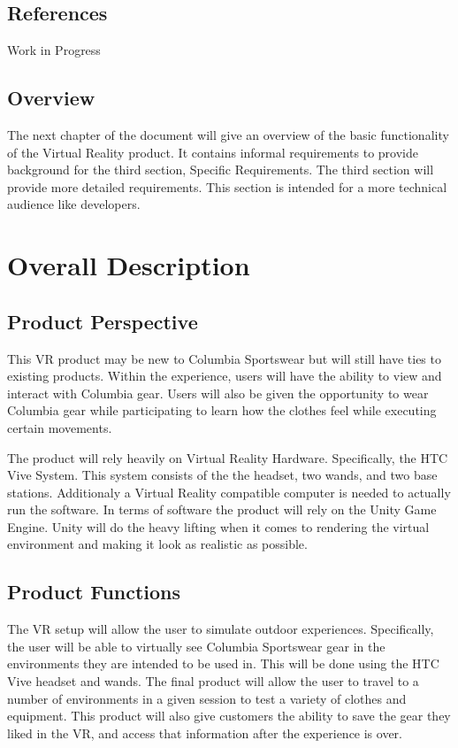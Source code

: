 \documentclass[10pt,journal,compsoc,onecolumn]{IEEEtran}
\begin{document}
\subsection{References}
Work in Progress

\subsection{Overview}
The next chapter of the document will give an overview of the basic functionality
of the Virtual Reality product. It contains informal requirements to provide
background for the third section, Specific Requirements. The third section
will provide more detailed requirements. This section is intended for a more
technical audience like developers.

\section{Overall Description}
\subsection{Product Perspective}
This VR product may be new to Columbia Sportswear but will still have ties to
existing products. Within the experience, users will have the ability to view
and interact with Columbia gear. Users will also be given the opportunity to
wear Columbia gear while participating to learn how the clothes feel while
executing certain movements.

The product will rely heavily on Virtual Reality Hardware.
Specifically, the HTC Vive System. This system consists of the the headset, two
wands, and two base stations. Additionaly a Virtual Reality compatible computer is needed to actually run the software. In terms of software the
product will rely on the Unity Game Engine. Unity will do the heavy lifting
when it comes to rendering the virtual environment and making it look as realistic as possible.

\subsection{Product Functions}
The VR setup will allow the user to simulate outdoor experiences.
Specifically, the user will be able to virtually see Columbia Sportswear
gear in the environments they are intended to be used in.
This will be done using the HTC Vive headset and wands. The final product
will allow the user to travel to a number of environments in a given session to
test a variety of clothes and equipment. This product will also give customers
the ability to save the gear they liked in the VR, and access that information after the experience is over.
\end{document}
